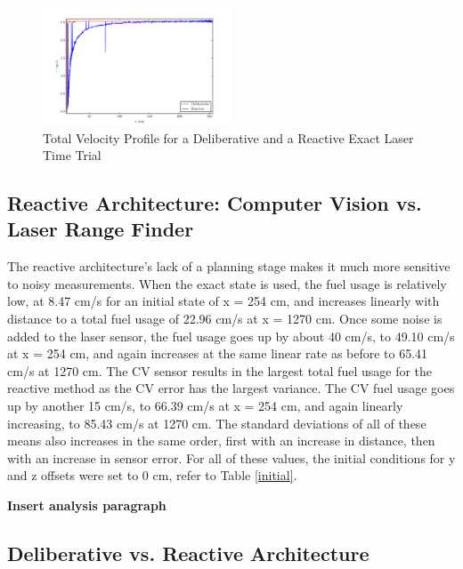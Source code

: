 \documentclass[journal, 10pt]{IEEEtran}
\begin{document}
\begin{figure}[tb]
\begin{center}
\includegraphics[width=0.5\textwidth]{figures/TotalVelocityNoisy.pdf}
\caption{Total Velocity Profile for a Deliberative and a Reactive Exact Laser Time Trial }
\label{noisy_total}
\end{center}
\end{figure}

\subsection{Reactive Architecture: Computer Vision vs. Laser Range Finder}
The reactive architecture's lack of a planning stage makes it much more sensitive to noisy measurements. When the exact state is used, the fuel usage is relatively low, at 8.47 cm/s for an initial state of x = 254 cm, and increases linearly with distance to a total fuel usage of 22.96 cm/s at x = 1270 cm. Once some noise is added to the laser sensor, the fuel usage goes up by about 40 cm/s, to 49.10 cm/s at x = 254 cm, and again increases at the same linear rate as before to 65.41 cm/s at 1270 cm. The CV sensor results in the largest total fuel usage for the reactive method as the CV error has the largest variance. The CV fuel usage goes up by another 15 cm/s, to 66.39 cm/s at x = 254 cm, and again linearly increasing, to 85.43 cm/s at 1270 cm. The standard deviations of all of these means also increases in the same order, first with an increase in distance, then with an increase in sensor error. For all of these values, the initial conditions for y and z offsets were set to 0 cm, refer to Table \ref{initial}.

\textbf{Insert analysis paragraph}

\subsection{Deliberative vs. Reactive Architecture}
\end{document}
